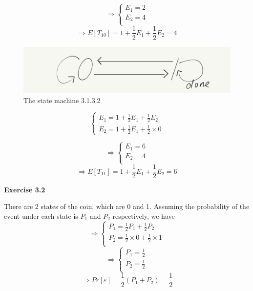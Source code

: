 \documentclass{article} %
\begin{document}
    $$
    \Rightarrow \begin{cases}
    E_1=2\\
    E_2=4\\
    \end{cases}
    $$
    $$
\Rightarrow E[T_{10}]=1+\frac{1}{2}E_1+\frac{1}{2}E_2=4
    $$

    \begin{figure}[H]
		\centering
		\includegraphics[scale=0.5]{Zzz2.png}
		\caption{The state machine 3.1.3.2}
		\label{fig:1}
	\end{figure}
    $$
    \begin{cases}
    E_1=1+\frac{1}{2}E_1+\frac{1}{2}E_2\\
    E_2=1+\frac{1}{2}E_1+\frac{1}{2} \times 0
    \end{cases}
    $$

    $$
    \Rightarrow \begin{cases}
    E_1=6\\
    E_2=4\\
    \end{cases}
    $$
    $$
\Rightarrow E[T_{11}]=1+\frac{1}{2}E_1+\frac{1}{2}E_2=6
    $$
    
    
	



	\textbf{Exercise 3.2}\par
	There are 2 states of the coin, which are 0 and 1. Assuming the probability of the event under each state is $P_1$ and $P_2$ respectively, we have
	$$
	\Rightarrow \begin{cases}
	P_1=\frac{1}{2}P_1+\frac{1}{2}P_2\\
	P_2=\frac{1}{2}\times 0+\frac{1}{2}\times 1\\
	\end{cases}
	$$
	$$\Rightarrow
	\begin{cases}
	P_1=\frac{1}{2}\\
	P_2=\frac{1}{2}\\
	\end{cases}
	$$
	$$
	\Rightarrow Pr[\varepsilon]=\frac{1}{2}(P_1+P_2)=\frac{1}{2}
	$$
\end{document}
